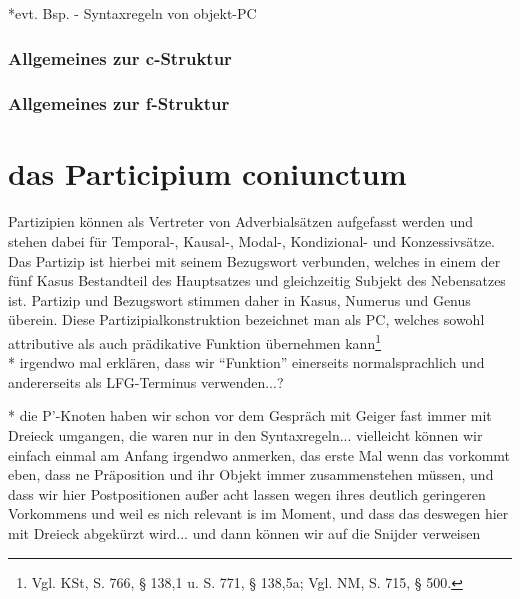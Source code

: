 \documentclass[12pt,a4paper]{article}
\begin{document}






*evt. Bsp. - Syntaxregeln von objekt-PC

\subsubsection{Allgemeines zur c-Struktur}
\subsubsection{Allgemeines zur f-Struktur}

\section{das Participium coniunctum}
Partizipien können als Vertreter von Adverbialsätzen aufgefasst werden und stehen dabei für Temporal-, Kausal-, Modal-, Kondizional- und Konzessivsätze. Das Partizip ist hierbei mit seinem Bezugswort verbunden, welches in einem der fünf Kasus Bestandteil des Hauptsatzes und gleichzeitig Subjekt des Nebensatzes ist. Partizip und Bezugswort stimmen daher in Kasus, Numerus und Genus überein. Diese Partizipialkonstruktion bezeichnet man als PC, welches sowohl attributive als auch prädikative Funktion übernehmen kann\footnote{Vgl. KSt, S. 766, § 138,1 u. S. 771, § 138,5a; Vgl. NM, S. 715, § 500.} \\
* irgendwo mal erklären, dass wir ``Funktion'' einerseits normalsprachlich und andererseits als LFG-Terminus verwenden...?

* die P'-Knoten haben wir schon vor dem Gespräch mit Geiger fast immer mit Dreieck umgangen, die waren nur in den Syntaxregeln... vielleicht können wir einfach einmal am Anfang irgendwo anmerken, das erste Mal wenn das vorkommt eben, dass ne Präposition und ihr Objekt immer zusammenstehen müssen, und dass wir hier Postpositionen außer acht lassen wegen ihres deutlich geringeren Vorkommens und weil es nich relevant is im Moment, und dass das deswegen hier mit Dreieck abgekürzt wird... und dann können wir auf die Snijder verweisen
\end{document}
